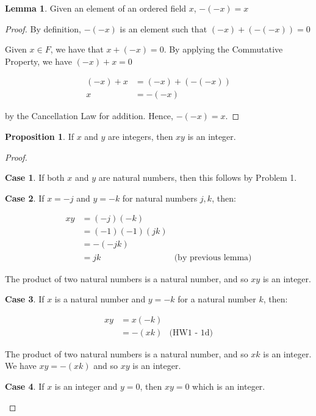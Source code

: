 \documentclass[12pt, letterpaper]{article}
\theoremstyle{definition} %
\newtheorem*{prop}{Proposition}
\newtheorem{lemma}{Lemma}[subsection]
\newtheorem{case}{Case}[subsection]
\begin{document}
\begin{lemma}
    Given an element of an ordered field $x$, $-(-x) = x$

    \begin{proof}
        By definition, $-(-x)$ is an element such that $(-x)+(-(-x)) = 0$

        Given $x\in F$, we have that $x+(-x) = 0$. By 
        applying the Commutative Property, we have $(-x)+x=0$

        \begin{align*}
            (-x) + x &= (-x) + (-(-x)) \\
                   x &= -(-x)
        \end{align*}

        by the Cancellation Law for addition. Hence, $-(-x)=x$.
    \end{proof}
\end{lemma}


\begin{prop}
    If $x$ and $y$ are integers, then $xy$ is an integer.
    \begin{proof}
        \begin{case}
            If both $x$ and $y$ are natural numbers, then this follows by 
            Problem 1.
        \end{case}

        \begin{case}
            If $x= -j$ and $y= -k$ for natural numbers $j,k$, then:

            \begin{align*}
                xy &= (-j)(-k) \\
                   &= (-1)(-1)(jk) \\  
                   &= -(-jk)    \\
                   &= jk        & \text{(by previous lemma)}
            \end{align*}

            The product of two natural numbers is a natural number, and so $xy$ 
            is an integer.
        \end{case}

        \begin{case}
            If $x$ is a natural number and $y=-k$ for a natural number $k$, then:

            \begin{align*}
                xy &= x(-k) \\
                   &= -(xk)    & \text{(HW1 - 1d)}
            \end{align*}

            The product of two natural numbers is a natural number, and so $xk$ 
            is an integer. We have $xy=-(xk)$ and so $xy$ is an integer.
        \end{case}

        \begin{case}
            If $x$ is an integer and $y=0$, then $xy=0$ which is an integer.
        \end{case}
    \end{proof}
\end{prop}
\end{document}
